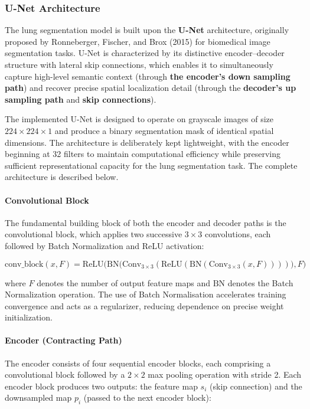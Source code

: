 \subsubsection{U-Net Architecture}
The lung segmentation model is built upon the \textbf{U-Net} architecture, originally proposed by Ronneberger, Fischer, and Brox (2015) for biomedical image segmentation tasks. U-Net is characterized by its distinctive encoder–decoder structure with lateral skip connections, which enables it to simultaneously capture high-level semantic context (through \textbf{the encoder's down sampling path}) and recover precise spatial localization detail (through the \textbf{decoder's up sampling path} and \textbf{skip connections}).

The implemented U-Net is designed to operate on grayscale images of size $224 \times 224 \times 1$ and produce a binary segmentation mask of identical spatial dimensions. The architecture is deliberately kept lightweight, with the encoder beginning at 32 filters to maintain computational efficiency while preserving sufficient representational capacity for the lung segmentation task. The complete architecture is described below.

\paragraph{Convolutional Block}
The fundamental building block of both the encoder and decoder paths is the convolutional block, which applies two successive $3 \times 3$ convolutions, each followed by Batch Normalization and ReLU activation:

\begin{equation}
	\mathrm{conv\_block}(x, F)
	=
	\mathrm{ReLU}\Big(
	\mathrm{BN}\big(
	\mathrm{Conv}_{3 \times 3}(
	\mathrm{ReLU}(
	\mathrm{BN}(\mathrm{Conv}_{3 \times 3}(x, F))
	)
	)\big), F
	\Big)
	\label{eq:conv_block}
\end{equation}

where $F$ denotes the number of output feature maps and $\mathrm{BN}$ denotes the Batch Normalization operation. The use of Batch Normalisation accelerates training convergence and acts as a regularizer, reducing dependence on precise weight initialization.

\paragraph{Encoder (Contracting Path)}
The encoder consists of four sequential encoder blocks, each comprising a convolutional block followed by a $2 \times 2$ max pooling operation with stride 2. Each encoder block produces two outputs: the feature map $s_i$ (skip connection) and the downsampled map $p_i$ (passed to the next encoder block):

